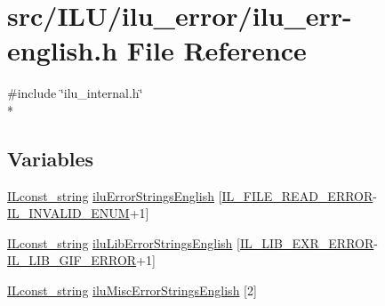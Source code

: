 \hypertarget{ilu__err-english_8h}{\section{src/\-I\-L\-U/ilu\-\_\-error/ilu\-\_\-err-\/english.h File Reference}
\label{ilu__err-english_8h}
}
{\ttfamily \#include \char`\"{}ilu\-\_\-internal.\-h\char`\"{}}\\*
\subsection*{Variables}
\begin{DoxyCompactItemize}
\item 
\hyperlink{il_8h_a103ef32cc870d648d471aff6c7076747}{I\-Lconst\-\_\-string} \hyperlink{ilu__err-english_8h_a74847ade99ac934be5a54b15fb8ab45e}{ilu\-Error\-Strings\-English} \mbox{[}\hyperlink{il_8h_ae70fdd3b6e8434371177ed2547b75841}{I\-L\-\_\-\-F\-I\-L\-E\-\_\-\-R\-E\-A\-D\-\_\-\-E\-R\-R\-O\-R}-\/\hyperlink{il_8h_adf311fb99b5d12d7ef3795b0ab3dd918}{I\-L\-\_\-\-I\-N\-V\-A\-L\-I\-D\-\_\-\-E\-N\-U\-M}+1\mbox{]}
\item 
\hyperlink{il_8h_a103ef32cc870d648d471aff6c7076747}{I\-Lconst\-\_\-string} \hyperlink{ilu__err-english_8h_ad9e38a00be7c1aaef7f92a02e47a8f24}{ilu\-Lib\-Error\-Strings\-English} \mbox{[}\hyperlink{il_8h_a4792903188701caaeaa625e49af84a66}{I\-L\-\_\-\-L\-I\-B\-\_\-\-E\-X\-R\-\_\-\-E\-R\-R\-O\-R}-\/\hyperlink{il_8h_ab2d4eb290bfe9e2e5c8d590213034e50}{I\-L\-\_\-\-L\-I\-B\-\_\-\-G\-I\-F\-\_\-\-E\-R\-R\-O\-R}+1\mbox{]}
\item 
\hyperlink{il_8h_a103ef32cc870d648d471aff6c7076747}{I\-Lconst\-\_\-string} \hyperlink{ilu__err-english_8h_a594d413e6a84713a0cc941e95b61650d}{ilu\-Misc\-Error\-Strings\-English} \mbox{[}2\mbox{]}
\end{DoxyCompactItemize}


